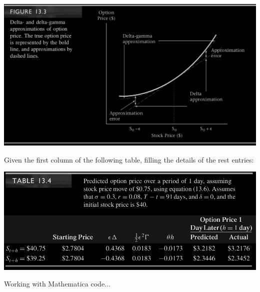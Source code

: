 \begin{frame}[fragile,t]
\begin{center}
  \includegraphics[scale=0.25]{figs/Figure_13-3.png}
\end{center}
\end{frame}
\begin{frame}[fragile,t]
 \begin{myexample}
  Given the first column of the following table, filling the details of the rest entries:
  \begin{center}
    \includegraphics[scale=0.25]{figs/Table_13-4.png}
  \end{center}
 \end{myexample}
 \begin{mysol}
    Working with Mathematica code... \myEnd
 \end{mysol}
\end{frame}
